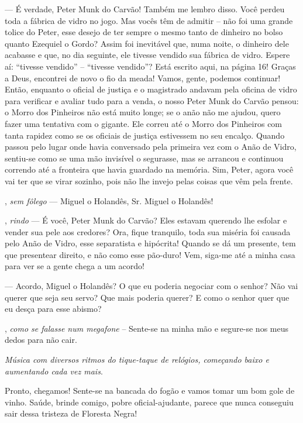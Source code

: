 \begin{myparindent}{0pt}
\begin{Parskip}
 --- É verdade, Peter Munk do Carvão! Também me lembro disso. Você
perdeu toda a fábrica de vidro no jogo. Mas vocês têm de admitir -- não
foi uma grande tolice do Peter, esse desejo de ter sempre o mesmo tanto
de dinheiro no bolso quanto Ezequiel o Gordo? Assim foi inevitável que,
numa noite, o dinheiro dele acabasse e que, no dia seguinte, ele tivesse
vendido sua fábrica de vidro. Espere aí: ``tivesse vendido'' --
``tivesse vendido''? Está escrito aqui, na página 16! Graças a Deus,
encontrei de novo o fio da meada! Vamos, gente, podemos continuar!
Então, enquanto o oficial de justiça e o magistrado andavam pela oficina
de vidro para verificar e avaliar tudo para a venda, o nosso Peter Munk
do Carvão pensou: o Morro dos Pinheiros não está muito longe; se o anão
não me ajudou, quero fazer uma tentativa com o gigante. Ele correu até o
Morro dos Pinheiros com tanta rapidez como se os oficiais de justiça
estivessem no seu encalço. Quando passou pelo lugar onde havia
conversado pela primeira vez com o Anão de Vidro, sentiu-se como se uma
mão invisível o segurasse, mas se arrancou e continuou correndo até a
fronteira que havia guardado na memória. Sim, Peter, agora você vai ter
que se virar sozinho, pois não lhe invejo pelas coisas que vêm pela
frente.

, \emph{sem fôlego} --- Miguel o Holandês, Sr. Miguel
o Holandês!

, \emph{rindo} --- É você, Peter Munk do Carvão? Eles
estavam querendo lhe esfolar e vender sua pele aos credores? Ora, fique
tranquilo, toda sua miséria foi causada pelo Anão de Vidro, esse
separatista e hipócrita! Quando se dá um presente, tem que presentear
direito, e não como esse pão-duro! Vem, siga-me até a minha casa para
ver se a gente chega a um acordo!

 --- Acordo, Miguel o Holandês? O que eu poderia
negociar com o senhor? Não vai querer que seja seu servo? Que mais
poderia querer? E como o senhor quer que eu desça para esse abismo?

, \emph{como se falasse num megafone} -- Sente-se na
minha mão e segure-se nos meus dedos para não cair.

\emph{Música com diversos ritmos do tique-taque de relógios, começando
baixo e aumentando cada vez mais}.

Pronto, chegamos! Sente-se na bancada do fogão e vamos tomar um bom gole
de vinho. Saúde, brinde comigo, pobre oficial-ajudante, parece que nunca
conseguiu sair dessa tristeza de Floresta Negra!


\end{Parskip}
\end{myparindent}
